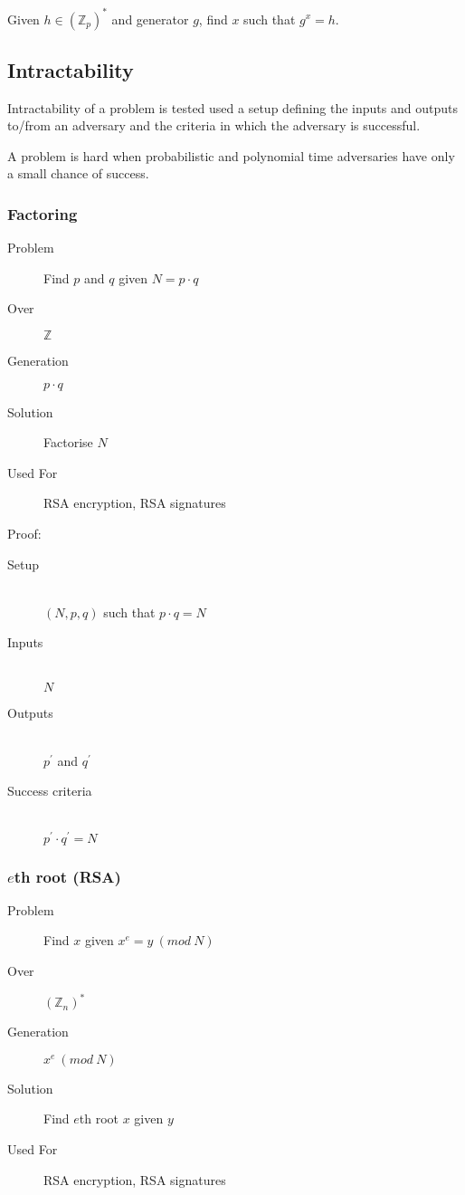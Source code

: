 \documentclass[a4paper]{article}
\begin{document}
Given $h \in (\mathbb{Z}_{p})^{*}$ and generator $g$, find $x$ such that $g^{x}
= h$.

\subsection{Intractability}

Intractability of a problem is tested used a setup defining the inputs and
outputs to/from an adversary and the criteria in which the adversary is
successful.

A problem is hard when probabilistic and polynomial time adversaries have only
a small chance of success.

\subsubsection{Factoring}

\begin{description}
  \item[Problem]
    Find $p$ and $q$ given $N = p \cdot q$
  \item[Over]
    $\mathbb{Z}$
  \item[Generation]
    $p \cdot q$
  \item[Solution]
    Factorise $N$
  \item[Used For]
    RSA encryption, RSA signatures
\end{description}

Proof:
\begin{description}
  \item[Setup] \hfill \\
    $(N, p, q)$ such that $p \cdot q = N$
  \item[Inputs] \hfill \\
    $N$
  \item[Outputs] \hfill \\
    $p^{\prime}$ and $q^{\prime}$
  \item[Success criteria] \hfill \\
    $p^{\prime} \cdot q^{\prime} = N$
\end{description}

\subsubsection{$e$th root (RSA)}

\begin{description}
  \item[Problem]
    Find $x$ given $x^{e} =y \: (mod \: N)$
  \item[Over]
    $(\mathbb{Z}_{n})^{*}$
  \item[Generation]
    $x^{e} \: (mod \: N)$
  \item[Solution]
    Find $e$th root $x$ given $y$
  \item[Used For]
    RSA encryption, RSA signatures
\end{description}
\end{document}
